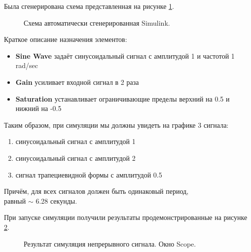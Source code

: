 \documentclass[a4paper,14pt]{extarticle}
\begin{document}
Была сгенерирована схема представленная на рисунке \ref{001}.

\begin{figure}[H]
\caption{Схема автоматически сгенерированная Simulink.}
\label{001}
\end{figure}

Краткое описание назначения элементов:
\begin{itemize}
\item \textbf{Sine Wave} задаёт синусоидальный сигнал с 
амплитудой 1 и частотой 1 rad/sec
\item \textbf{Gain} усиливает входной сигнал в 2 раза
\item \textbf{Saturation} устанавливает ограничивающие пределы 
верхний на 0.5 и нижний на -0.5\\
\end{itemize}

Таким образом, при симуляции мы должны увидеть на графике 3 
сигнала:
\begin{enumerate}
\item синусоидальный сигнал с амплитудой 1
\item синусоидальный сигнал с амплитудой 2
\item сигнал трапециевидной формы с амплитудой 0.5
\end{enumerate}

Причём, для всех сигналов должен быть одинаковый период,\\ равный 
$\sim$ 6.28 секунды.\\

\newpage

При запуске симуляции получили результаты продемонстрированные на 
рисунке \ref{002}.

\begin{figure}[H]
\caption{Результат симуляция непрерывного сигнала. Окно Scope.}
\label{002}
\end{figure}
\end{document}

